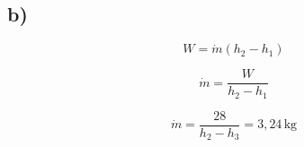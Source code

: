 

\subsection*{b)}

\[
W = \dot{m} (h_{2} - h_{1})
\]

\[
\dot{m} = \frac{W}{h_{2} - h_{1}}
\]

\[
\dot{m} = \frac{28}{h_{2} - h_{3}} = 3,24 \, \text{kg}
\]